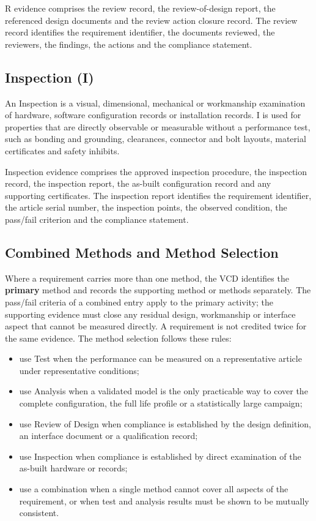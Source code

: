 R evidence comprises the review record, the review-of-design report, the referenced design documents and the review action closure record. The review record identifies the requirement identifier, the documents reviewed, the reviewers, the findings, the actions and the compliance statement.

\subsection{Inspection (I)}

An Inspection is a visual, dimensional, mechanical or workmanship examination of hardware, software configuration records or installation records. I is used for properties that are directly observable or measurable without a performance test, such as bonding and grounding, clearances, connector and bolt layouts, material certificates and safety inhibits.

Inspection evidence comprises the approved inspection procedure, the inspection record, the inspection report, the as-built configuration record and any supporting certificates. The inspection report identifies the requirement identifier, the article serial number, the inspection points, the observed condition, the pass/fail criterion and the compliance statement.

\subsection{Combined Methods and Method Selection}

Where a requirement carries more than one method, the VCD identifies the \textbf{primary} method and records the supporting method or methods separately. The pass/fail criteria of a combined entry apply to the primary activity; the supporting evidence must close any residual design, workmanship or interface aspect that cannot be measured directly. A requirement is not credited twice for the same evidence. The method selection follows these rules:
\begin{itemize}
    \item use Test when the performance can be measured on a representative article under representative conditions;
    \item use Analysis when a validated model is the only practicable way to cover the complete configuration, the full life profile or a statistically large campaign;
    \item use Review of Design when compliance is established by the design definition, an interface document or a qualification record;
    \item use Inspection when compliance is established by direct examination of the as-built hardware or records;
    \item use a combination when a single method cannot cover all aspects of the requirement, or when test and analysis results must be shown to be mutually consistent.
\end{itemize}

